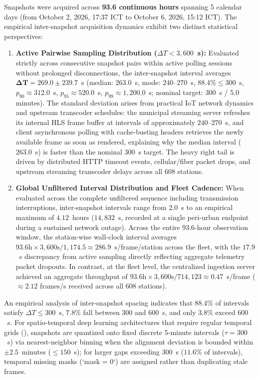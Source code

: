 \documentclass[preprint,12pt]{elsarticle}
\begin{document}
Snapshots were acquired across \textbf{93.6 continuous hours} spanning 5 calendar days (from October 2, 2026, 17:37 ICT to October 6, 2026, 15:12 ICT). The empirical inter-snapshot acquisition dynamics exhibit two distinct statistical perspectives:
\begin{enumerate}
    \item \textbf{Active Pairwise Sampling Distribution ($\Delta T < 3,600$~s):} Evaluated strictly across consecutive snapshot pairs within active polling sessions without prolonged disconnections, the inter-snapshot interval averages $\mathbf{\Delta T = 269.0 \pm 239.7}$~s (median: $263.0$~s, mode: $240$--$270$~s, $88.4\% \le 300$~s, $p_{90} \approx 312.0$~s, $p_{95} \approx 520.0$~s, $p_{99} \approx 1,200.0$~s; nominal target: $300$~s / 5.0 minutes). The standard deviation arises from practical IoT network dynamics and upstream transcoder schedules: the municipal streaming server refreshes its internal HLS frame buffer at intervals of approximately $240$--$270$~s, and client asynchronous polling with cache-busting headers retrieves the newly available frame as soon as rendered, explaining why the median interval ($263.0$~s) is faster than the nominal $300$~s target. The heavy right tail is driven by distributed HTTP timeout events, cellular/fiber packet drops, and upstream streaming transcoder delays across all 608 stations.
    \item \textbf{Global Unfiltered Interval Distribution and Fleet Cadence:} When evaluated across the complete unfiltered sequence including transmission interruptions, inter-snapshot intervals range from $2.0$~s to an empirical maximum of $4.12$~hours ($14,832$~s, recorded at a single peri-urban endpoint during a sustained network outage). Across the entire 93.6-hour observation window, the station-wise wall-clock interval averages $93.6\text{h} \times 3,600\text{s} / 1,174.5 \approx \mathbf{286.9}$~s/frame/station across the fleet, with the $17.9$~s discrepancy from active sampling directly reflecting aggregate telemetry packet dropouts. In contrast, at the fleet level, the centralized ingestion server achieved an aggregate throughput of $93.6\text{h} \times 3,600\text{s} / 714,123 \approx \mathbf{0.47}$~s/frame ($\approx 2.12$ frames/s received across all 608 stations).
\end{enumerate}
An empirical analysis of inter-snapshot spacing indicates that $\mathbf{88.4\%}$ of intervals satisfy $\Delta T \le 300$~s, $\mathbf{7.8\%}$ fall between $300$ and $600$~s, and only $\mathbf{3.8\%}$ exceed $600$~s. For spatio-temporal deep learning architectures that require regular temporal grids (), snapshots are quantized onto fixed discrete 5-minute intervals ($\tau = 300$~s) via nearest-neighbor binning when the alignment deviation is bounded within $\pm 2.5$~minutes ($\le 150$~s); for larger gaps exceeding $300$~s ($11.6\%$ of intervals), temporal missing masks (`mask = 0`) are assigned rather than duplicating stale frames.
\end{document}
